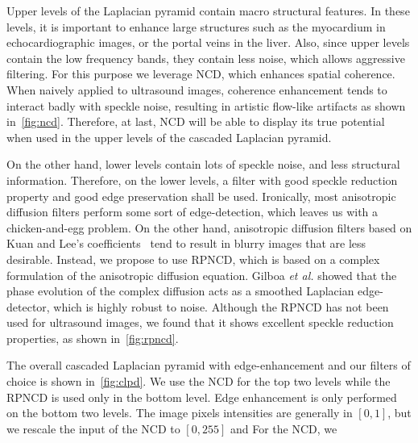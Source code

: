 %

Upper levels of the Laplacian pyramid contain macro structural features.
In these levels, it is important to enhance large structures such as the myocardium in echocardiographic images, or the portal veins in the liver.
Also, since upper levels contain the low frequency bands, they contain less noise, which allows aggressive filtering.
For this purpose we leverage NCD, which enhances spatial coherence.
When naively applied to ultrasound images, coherence enhancement tends to interact badly with speckle noise, resulting in artistic flow-like artifacts as shown in~\cref{fig:ncd}.
Therefore, at last, NCD will be able to display its true potential when used in the upper levels of the cascaded Laplacian pyramid.

On the other hand, lower levels contain lots of speckle noise, and less structural information.
Therefore, on the lower levels, a filter with good speckle reduction property and good edge preservation shall be used.
Ironically, most anisotropic diffusion filters perform some sort of edge-detection, which leaves us with a chicken-and-egg problem.
On the other hand, anisotropic diffusion filters based on Kuan and Lee's coefficients~\cite{yongjianyu_speckle_2002, aja-fernandez_estimation_2006, krissian_oriented_2007} tend to result in blurry images that are less desirable.
Instead, we propose to use RPNCD, which is based on a complex formulation of the anisotropic diffusion equation.
Gilboa \textit{et al.} showed that the phase evolution of the complex diffusion acts as a smoothed Laplacian edge-detector, which is highly robust to noise.
Although the RPNCD has not been used for ultrasound images, we found that it shows excellent speckle reduction properties, as shown in~\cref{fig:rpncd}.

The overall cascaded Laplacian pyramid with edge-enhancement and our filters of choice is shown in~\cref{fig:clpd}.
We use the NCD for the top two levels while the RPNCD is used only in the bottom level.
Edge enhancement is only performed on the bottom two levels.
The image pixels intensities are generally in \([0, 1]\), but we rescale the input of the NCD to \([0, 255]\) and 
For the NCD, we 

